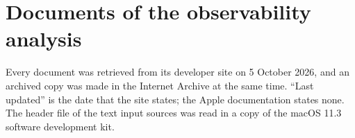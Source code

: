 
\section*{Documents of the observability analysis}
\label{sec:supp-documents}

Every document was retrieved from its developer site on 5 October 2026, and an archived copy was made in the
Internet Archive at the same time. ``Last updated'' is the date that the site states; the Apple documentation states
none. The header file of the text input sources was read in a copy of the macOS 11.3 software development kit.

